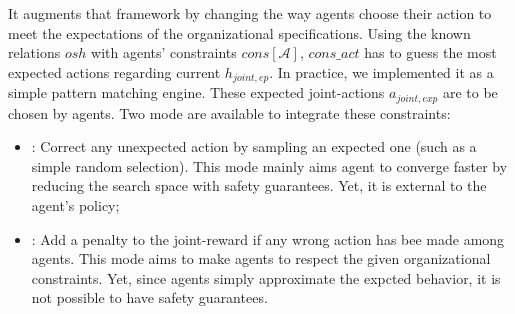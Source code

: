 \documentclass{ecai}
\newcounter{relation}
\begin{document}
It augments that framework by changing the way agents choose their action to meet the expectations of the organizational specifications. Using the known relations $osh$ with agents' constraints $cons[\mathcal{A}]$, $cons\_act$ has to guess the most expected actions regarding current $h_{joint,ep}$. In practice, we implemented it as a simple pattern matching engine. These expected joint-actions $a_{joint,exp}$ are to be chosen by agents. Two mode are available to integrate these constraints:
\begin{itemize}
    \item {}: Correct any unexpected action by sampling an expected one (such as a simple random selection). This mode mainly aims agent to converge faster by reducing the search space with safety guarantees. Yet, it is external to the agent's policy;
    \item {}: Add a penalty to the joint-reward if any wrong action has bee made among agents. This mode aims to make agents  to respect the given organizational constraints. Yet, since agents simply approximate the expcted behavior, it is not possible to have safety guarantees.
\end{itemize}


\end{document}
